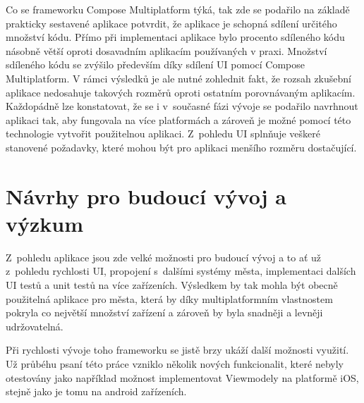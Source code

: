 Co se frameworku Compose Multiplatform týká, tak zde se podařilo na základě prakticky sestavené aplikace potvrdit, že aplikace je schopná 
sdílení určitého množství kódu. Přímo při implementaci aplikace bylo procento sdíleného kódu násobně větší oproti dosavadním aplikacím
používaných v praxi. Množství sdíleného kódu se zvýšilo především díky sdílení UI pomocí Compose Multiplatform. 
V rámci výsledků je ale nutné zohlednit fakt, že rozsah zkušební aplikace nedosahuje 
takových rozměrů oproti ostatním porovnávaným aplikacím. Každopádně lze konstatovat, že se i v~současné fázi vývoje se podařilo navrhnout
aplikaci tak, aby fungovala na více platformách a zároveň je možné pomocí této technologie vytvořit použitelnou aplikaci. Z~pohledu UI 
splnňuje veškeré stanovené požadavky, které mohou být pro aplikaci menšího rozměru dostačující.

\bigskip






\section{Návrhy pro budoucí vývoj a výzkum}
Z~pohledu aplikace jsou zde velké možnosti pro budoucí vývoj a to ať už z~pohledu rychlosti UI, propojení s~dalšími systémy města, 
implementaci dalších UI testů a unit testů na více zařízeních. Výsledkem by tak mohla být obecně použitelná aplikace pro města,
která by díky multiplatformním vlastnostem pokryla co největší množství zařízení a zároveň by byla snadněji a levněji udržovatelná.

Při rychlosti vývoje toho frameworku se jistě brzy ukáží další možnosti využití.
Už průbéhu psaní této práce vzniklo několik nových funkcionalit, které nebyly otestovány jako například možnost
implementovat Viewmodely na platformě iOS, stejně jako je tomu na android zařízeních.




